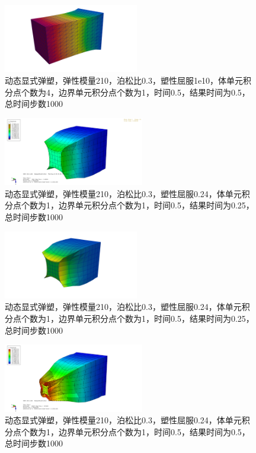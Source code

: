 \begin{figure}[!htbp]
  \centering
  \includegraphics[height=3cm]{fig/4/4.1.5/6-1.png}
  \caption{动态显式弹塑，弹性模量210，泊松比0.3，塑性屈服1e10，体单元积分点个数为4，边界单元积分点个数为1，时间0.5，结果时间为0.5，总时间步数1000}
  \label{fig:4.1.4:4}
\end{figure}

\begin{figure}[!htbp]
  \centering
  \includegraphics[height=3cm]{fig/4/4.1.5/7.png}
  \caption{动态显式弹塑，弹性模量210，泊松比0.3，塑性屈服0.24，体单元积分点个数为1，边界单元积分点个数为1，时间0.5，结果时间为0.25，总时间步数1000}
  \label{fig:4.1.4:4}
\end{figure}

\begin{figure}[!htbp]
  \centering
  \includegraphics[height=3cm]{fig/4/4.1.5/7-1.png}
  \caption{动态显式弹塑，弹性模量210，泊松比0.3，塑性屈服0.24，体单元积分点个数为1，边界单元积分点个数为1，时间0.5，结果时间为0.25，总时间步数1000}
  \label{fig:4.1.4:4}
\end{figure}

\begin{figure}[!htbp]
  \centering
  \includegraphics[height=3cm]{fig/4/4.1.5/8.png}
  \caption{动态显式弹塑，弹性模量210，泊松比0.3，塑性屈服0.24，体单元积分点个数为1，边界单元积分点个数为1，时间0.5，结果时间为0.5，总时间步数1000}
  \label{fig:4.1.4:4}
\end{figure}

